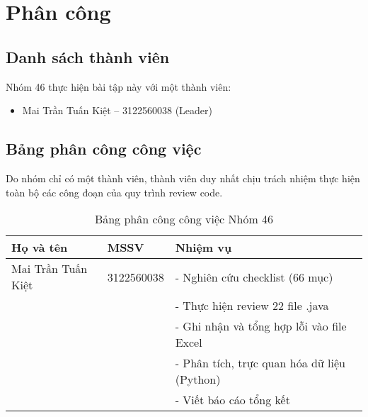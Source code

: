 \chapter{Phân công}

\section{Danh sách thành viên}
Nhóm 46 thực hiện bài tập này với một thành viên:
\begin{itemize}
    \item Mai Trần Tuấn Kiệt – 3122560038 (Leader)
\end{itemize}

\section{Bảng phân công công việc}
Do nhóm chỉ có một thành viên, thành viên duy nhất chịu trách nhiệm thực hiện toàn bộ các công đoạn của quy trình review code.
\begin{table}[htbp]
\centering
\caption{Bảng phân công công việc Nhóm 46}
\begin{tabular}{@{}lll@{}}
\toprule
\textbf{Họ và tên} & \textbf{MSSV} & \textbf{Nhiệm vụ} \\ \midrule
Mai Trần Tuấn Kiệt & 3122560038 & - Nghiên cứu checklist (66 mục) \\
 & & - Thực hiện review 22 file .java \\
 & & - Ghi nhận và tổng hợp lỗi vào file Excel \\
 & & - Phân tích, trực quan hóa dữ liệu (Python) \\
 & & - Viết báo cáo tổng kết \\ \bottomrule
\end{tabular}
\end{table}

\newpage